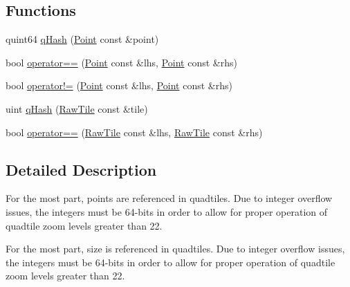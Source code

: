 \subsection*{\-Functions}
\begin{DoxyCompactItemize}
\item 
quint64 \hyperlink{group___o_p_map_widget_ga684da93d6a34494be39f2a374429e7e7}{q\-Hash} (\hyperlink{structcore_1_1_point}{\-Point} const \&point)
\item 
bool \hyperlink{group___o_p_map_widget_ga652c57ec321fe6e8b42404776fb48e49}{operator==} (\hyperlink{structcore_1_1_point}{\-Point} const \&lhs, \hyperlink{structcore_1_1_point}{\-Point} const \&rhs)
\item 
bool \hyperlink{group___o_p_map_widget_ga9fd3fb077a6e407e4c5a477a8c6d73a0}{operator!=} (\hyperlink{structcore_1_1_point}{\-Point} const \&lhs, \hyperlink{structcore_1_1_point}{\-Point} const \&rhs)
\item 
uint \hyperlink{group___o_p_map_widget_ga45a81278b07bda2f00748b2eb7f10e01}{q\-Hash} (\hyperlink{classcore_1_1_raw_tile}{\-Raw\-Tile} const \&tile)
\item 
bool \hyperlink{group___o_p_map_widget_ga17ed512ed98b14303d6db91fc1624c5e}{operator==} (\hyperlink{classcore_1_1_raw_tile}{\-Raw\-Tile} const \&lhs, \hyperlink{classcore_1_1_raw_tile}{\-Raw\-Tile} const \&rhs)
\end{DoxyCompactItemize}


\subsection{\-Detailed \-Description}
\-For the most part, points are referenced in quadtiles. \-Due to integer overflow issues, the integers must be 64-\/bits in order to allow for proper operation of quadtile zoom levels greater than 22.

\-For the most part, size is referenced in quadtiles. \-Due to integer overflow issues, the integers must be 64-\/bits in order to allow for proper operation of quadtile zoom levels greater than 22. 